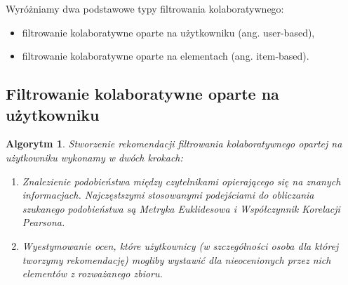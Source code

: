 \documentclass[12pt,a4paper]{report}
\newtheorem{algorytm}[df]{Algorytm}
\begin{document}
Wyróżniamy dwa podstawowe typy filtrowania kolaboratywnego:
\begin{itemize}
\item filtrowanie kolaboratywne oparte na użytkowniku (ang. user-based),
\item filtrowanie kolaboratywne oparte na  elementach (ang. item-based).
\end{itemize}

\subsection{Filtrowanie kolaboratywne oparte na użytkowniku}

\begin{algorytm}
Stworzenie rekomendacji filtrowania kolaboratywnego opartej na użytkowniku wykonamy w dwóch krokach:
\begin{enumerate}
\item Znalezienie podobieństwa między czytelnikami opierającego się na znanych informacjach. Najczęstszymi stosowanymi podejściami do obliczania szukanego podobieństwa są Metryka Euklidesowa i Współczynnik Korelacji Pearsona.
\item Wyestymowanie ocen, które użytkownicy (w szczególności osoba dla której tworzymy rekomendację) mogliby wystawić dla nieocenionych przez nich elementów z rozważanego zbioru.
\end{enumerate}
\end{algorytm}
\end{document}
